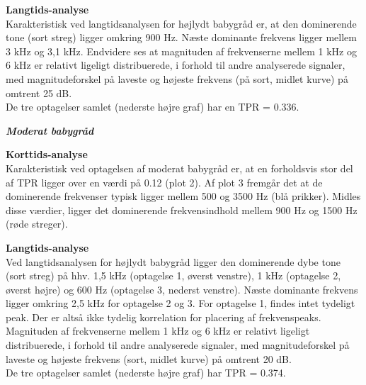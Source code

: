 
\newpage
\textbf{Langtids-analyse} \\
Karakteristisk ved langtidsanalysen for højlydt babygråd er, at den dominerende tone (sort streg) ligger omkring 900 Hz. Næste dominante frekvens ligger mellem 3 kHz og 3,1 kHz. Endvidere ses at magnituden af frekvenserne mellem 1 kHz og 6 kHz er relativt ligeligt distribuerede, i forhold til andre analyserede signaler, med magnitudeforskel på laveste og højeste frekvens (på sort, midlet kurve) på omtrent 25 dB. \\
De tre optagelser samlet (nederste højre graf) har en TPR = 0.336.



\newpage
\begin{center} \textit{\textbf{Moderat babygråd}} \end{center}
\textbf{Korttids-analyse} \\
Karakteristisk ved optagelsen af moderat babygråd er, at en forholdsvis stor del af TPR ligger over en værdi på 0.12 (plot 2). Af plot 3 fremgår det at de dominerende frekvenser typisk ligger mellem 500 og 3500 Hz (blå prikker). Midles disse værdier, ligger det dominerende frekvensindhold mellem 900 Hz og 1500 Hz (røde streger). 


\newpage
\textbf{Langtids-analyse} \\
Ved langtidsanalysen for højlydt babygråd ligger den dominerende dybe tone (sort streg) på hhv. 1,5 kHz (optagelse 1, øverst venstre), 1 kHz (optagelse 2, øverst højre) og 600 Hz (optagelse 3, nederst venstre). Næste dominante frekvens ligger omkring 2,5 kHz for optagelse 2 og 3. For optagelse 1, findes intet tydeligt peak. Der er altså ikke tydelig korrelation for placering af frekvenspeaks. Magnituden af frekvenserne mellem 1 kHz og 6 kHz er relativt ligeligt distribuerede, i forhold til andre analyserede signaler, med magnitudeforskel på laveste og højeste frekvens (sort, midlet kurve) på omtrent 20 dB. \\
De tre optagelser samlet (nederste højre graf) har TPR = 0.374.

